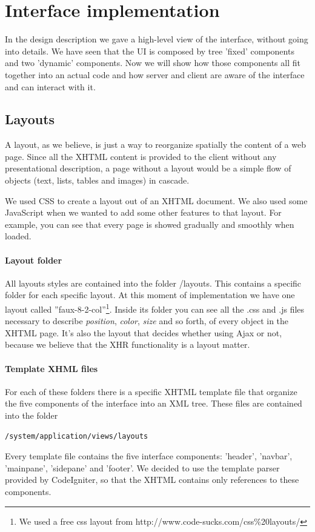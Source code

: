 \documentclass[10pt]{report}
\begin{document}
\section{Interface implementation}
In the design description we gave a high-level view of the interface, without going into details. We have seen that the UI is composed by tree 'fixed' components and two 'dynamic' components. Now we will show how those components all fit together into an actual code and how server and client are aware of the interface and can interact with it.

\subsection{Layouts}
A layout, as we believe, is just a way to reorganize spatially the content of a web page. Since all the XHTML content is provided to the client without any presentational description, a page without a layout would be a simple flow of objects (text, lists, tables and images) in cascade.

We used CSS to create a layout out of an XHTML document. We also used some JavaScript when we wanted to add some other features to that layout. For example, you can see that every page is showed gradually and smoothly when loaded.

\paragraph{Layout folder}
All layouts styles are contained into the folder /layouts. This contains a specific folder for each specific layout. At this moment of implementation we have one layout called ''faux-8-2-col''\footnote{We used a free css layout from http://www.code-sucks.com/css\%20layouts/}. Inside its folder you can see all the .css and .js files necessary to describe \emph{position}, \emph{color}, \emph{size} and so forth, of every object in the XHTML page. It's also the layout that decides whether using Ajax or not, because we believe that the XHR functionality is a layout matter.

\paragraph{Template XHML files}
For each of these folders there is a specific XHTML template file that organize the five components of the interface into an XML tree. These files are contained into the folder
\begin{verbatim}
/system/application/views/layouts
\end{verbatim}
Every template file contains the five interface components: 'header', 'navbar', 'mainpane', 'sidepane' and 'footer'. We decided to use the template parser provided by CodeIgniter, so that the XHTML contains only references to these components.
\end{document}
